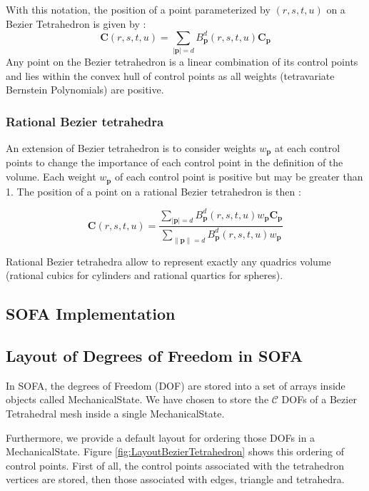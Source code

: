 \documentclass[a4paper,11pt]{article}
\newcommand{\controls}{{\mathcal C}}
\newcommand{\control}{{\mathbf C}}
\newcommand{\degree}{{d}}
\begin{document}
With this notation, the position of a point parameterized by $(r,s,t,u)$ on a Bezier Tetrahedron is given by :
\[
\control(r,s,t,u)=\sum_{|\mathbf p|=\degree}  B^d_{\mathbf p}(r,s,t,u) \control_{\mathbf p}
\]
Any point on the Bezier tetrahedron is a linear combination of its control points and lies within the convex hull of control points as all weights (tetravariate Bernstein Polynomials) are positive.


\subsubsection{Rational Bezier tetrahedra}
An extension of Bezier tetrahedron is to consider weights $w_{\mathbf p}$ at each control points to change the importance of each control point in the definition of the volume. Each weight  $w_{\mathbf p}$ of each control point is positive but may be greater than 1. 
The position of a point on a rational Bezier tetrahedron is then :

\[
\control(r,s,t,u)=\frac{\sum_{|\mathbf p|=\degree}  B^d_{\mathbf p}(r,s,t,u) w_{\mathbf p} \control_{\mathbf p}}{\sum_{\|\mathbf p\|=\degree}  B^d_{\mathbf p}(r,s,t,u) w_{\mathbf p}}
\]

Rational Bezier tetrahedra allow to represent exactly any quadrics volume (rational cubics for cylinders and rational quartics for spheres).



\subsection{SOFA Implementation}

\subsection{Layout of Degrees of Freedom in SOFA}

In SOFA, the degrees of Freedom (DOF) are stored into a set of arrays inside objects called MechanicalState.
We have chosen to store the $\controls$ DOFs of a Bezier Tetrahedral mesh inside a single MechanicalState. 

Furthermore, we provide a default layout for ordering those DOFs in a
MechanicalState. 
Figure \ref{fig:LayoutBezierTetrahedron} shows this ordering of control points. First of all, the control points associated with the tetrahedron vertices are stored, then those associated with edges, triangle and tetrahedra.
\end{document}
